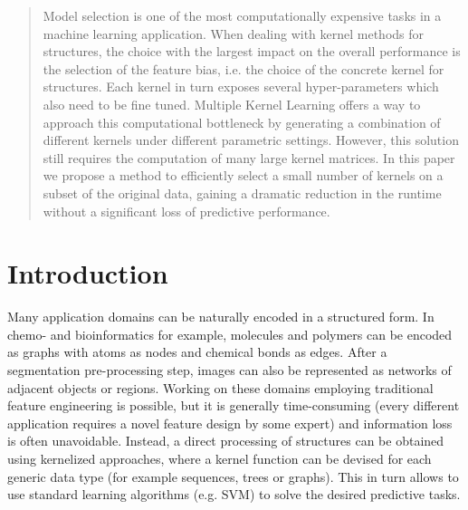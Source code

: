 \documentclass{esannV2}
\newcommand{\1}{{\bf 1}}
\renewcommand{\baselinestretch}{.96}
\begin{document}

\begin{abstract}

Model selection is one of the most computationally expensive tasks in a
machine learning application. When dealing with kernel methods for structures,
the choice with the largest impact on the overall performance is the selection
of the feature bias, i.e. the choice of the concrete kernel for structures.
Each kernel in turn exposes several hyper-parameters which also need to be
fine tuned.  Multiple Kernel Learning offers a way to approach this
computational bottleneck by generating a combination of different kernels
under different parametric settings. However, this solution still requires the
computation of many large kernel matrices. In this paper we propose a method
to efficiently select a small number of kernels on a subset of the original
data, gaining a dramatic reduction in the runtime without a significant loss
of predictive performance.

\end{abstract}


\section{Introduction}

Many application domains can be naturally encoded in a structured form. In
chemo- and bioinformatics for example, molecules and polymers can be encoded
as graphs with atoms as nodes and chemical bonds as edges. After a
segmentation pre-processing step, images can also be represented as networks
of adjacent objects or regions. Working on these domains employing traditional
feature engineering is possible, but it is generally time-consuming (every
different application requires a novel feature design by some expert) and
information loss is often unavoidable. Instead, a direct processing of
structures can be obtained using kernelized approaches, where a kernel
function can be devised for each generic data type (for example sequences,
trees or graphs). This in turn allows to use standard learning algorithms
(e.g. SVM) to solve the desired predictive tasks.
\end{document}

